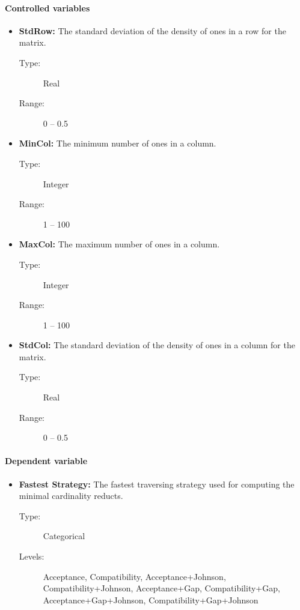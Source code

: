 \documentclass[11pt]{article}   %
\begin{document}
    \paragraph{Controlled variables}  
  	\begin{itemize}
  	   \item \textbf{StdRow:} The standard deviation of the density of ones in a row for the matrix.
  	   		\begin{description}
  	   			\item[Type:] Real
  	   			\item[Range:] 0 -- 0.5
  	   		\end{description}
  	   \item \textbf{MinCol:} The minimum number of ones in a column.
  	   		\begin{description}
  	   			\item[Type:] Integer
  	   			\item[Range:] 1 -- 100
  	   		\end{description}
  	   \item \textbf{MaxCol:} The maximum number of ones in a column.
  	   		\begin{description}
  	   			\item[Type:] Integer
  	   			\item[Range:] 1 -- 100
  	   		\end{description}
  	   \item \textbf{StdCol:} The standard deviation of the density of ones in a column for the matrix.
  	   		\begin{description}
  	   			\item[Type:] Real
  	   			\item[Range:] 0 -- 0.5
  	   		\end{description}
    \end{itemize}
    \paragraph{Dependent variable}  
  	\begin{itemize}
  	   \item \textbf{Fastest Strategy:} The fastest traversing strategy used for computing the minimal cardinality
  	   								    reducts.
  	   		\begin{description}
  	   			\item[Type:] Categorical
  	   			\item[Levels:] Acceptance, Compatibility, Acceptance+Johnson, Compatibility+Johnson, 
  	   						   Acceptance+Gap, Compatibility+Gap, Acceptance+Gap+Johnson, 
  	   						   Compatibility+Gap+Johnson
  	   		\end{description}
    \end{itemize}
  
\end{document}
